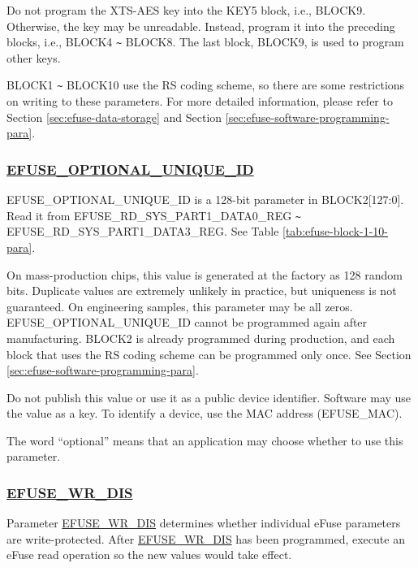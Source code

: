 \documentclass[main\_\_EN.tex]{subfiles}
\begin{document}
\begin{tiplisting}
Do not program the XTS-AES key into the KEY5 block, i.e., BLOCK9. Otherwise, the key may be unreadable. Instead, program it into the preceding blocks, i.e., BLOCK4 \verb+~+ BLOCK8. The last block, BLOCK9, is used to program other keys.
\end{tiplisting}

BLOCK1 \verb+~+ BLOCK10 use the RS coding scheme, so there are some restrictions on writing to these parameters. For more detailed information, please refer to Section \ref{sec:efuse-data-storage} and Section \ref{sec:efuse-software-programming-para}.

\subsubsection{\texorpdfstring{\hyperref[fielddesc:EFUSEOPTIONALUNIQUEID]{EFUSE\_OPTIONAL\_UNIQUE\_ID}}{EFUSE\_OPTIONAL\_UNIQUE\_ID}}
\label{sec:efuse-optional-unique-id}

EFUSE\_OPTIONAL\_UNIQUE\_ID is a 128-bit parameter in BLOCK2[127:0]. Read it from EFUSE\_RD\_SYS\_PART1\_DATA0\_REG \verb+~+ EFUSE\_RD\_SYS\_PART1\_DATA3\_REG. See Table \ref{tab:efuse-block-1-10-para}.

On mass-production chips, this value is generated at the factory as 128 random bits. Duplicate values are extremely unlikely in practice, but uniqueness is not guaranteed. On engineering samples, this parameter may be all zeros. EFUSE\_OPTIONAL\_UNIQUE\_ID cannot be programmed again after manufacturing. BLOCK2 is already programmed during production, and each block that uses the RS coding scheme can be programmed only once. See Section \ref{sec:efuse-software-programming-para}.

Do not publish this value or use it as a public device identifier. Software may use the value as a key. To identify a device, use the MAC address (EFUSE\_MAC).

The word ``optional'' means that an application may choose whether to use this parameter.

\subsubsection{\hyperref[fielddesc:EFUSEWRDIS]{EFUSE\_WR\_DIS}}
\label{sec:efuse-wr-dis}

Parameter \hyperref[fielddesc:EFUSEWRDIS]{EFUSE\_WR\_DIS} determines whether individual eFuse parameters are write-protected. After \hyperref[fielddesc:EFUSEWRDIS]{EFUSE\_WR\_DIS} has been programmed, execute an eFuse read operation so the new values would take effect.
\end{document}

